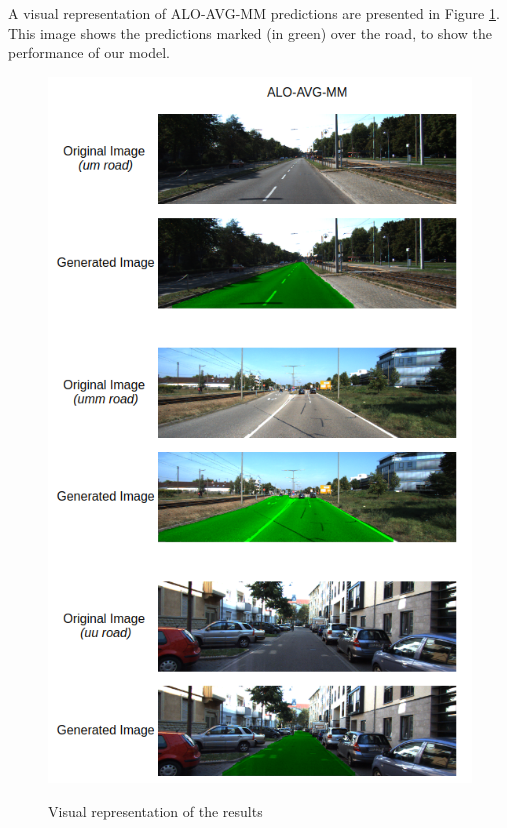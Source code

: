 

A visual representation of ALO-AVG-MM predictions are presented in Figure \ref{fig:visual_representation}. This image shows the predictions marked (in green) over the road, to show the performance of our model.

\begin{figure}
  \caption{Visual representation of the results}
  \centering
  \includegraphics[width=1.\columnwidth]{figures/falreis/visual_representation.png}
  \label{fig:visual_representation}
\end{figure}
